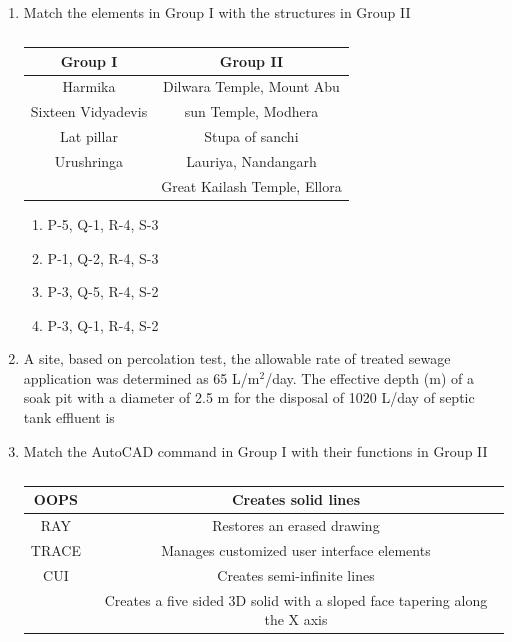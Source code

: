 \documentclass[journal,12pt,onecolumn]{IEEEtran}
\theoremstyle{remark}
\begin{document}
\begin{enumerate}
\hfill{}

\item Match the elements in Group I with the structures in Group II

\begin{table}[H]
\centering
\begin{tabular}{c|c}
Group I & Group II \\
\hline
Harmika & Dilwara Temple, Mount Abu \\
Sixteen Vidyadevis & sun Temple, Modhera \\
Lat pillar & Stupa of sanchi \\
Urushringa & Lauriya, Nandangarh \\
 & Great Kailash Temple, Ellora \\
\end{tabular}
\caption*{}
\label{tab:Q.35}
\end{table}

\hfill{}
\begin{enumerate}
\item P-5, Q-1, R-4, S-3
\item P-1, Q-2, R-4, S-3
\item P-3, Q-5, R-4, S-2
\item P-3, Q-1, R-4, S-2
\end{enumerate}

\item A site, based on percolation test, the allowable rate of treated sewage application was determined as 65 L/m$^2$/day. The effective depth (m) of a soak pit with a diameter of 2.5 m for the disposal of 1020 L/day of septic tank effluent is \underline{\hspace{2cm}}

\hfill{}

\item Match the AutoCAD command in Group I with their functions in Group II

\begin{table}[H]
\centering
\begin{tabular}{c|c}
OOPS & Creates solid lines \\
\hline
RAY & Restores an erased drawing \\
\hline
TRACE & Manages customized user interface elements \\
\hline
CUI & Creates semi-infinite lines \\
\hline
 & Creates a five sided 3D solid with a sloped face tapering along the X axis \\
\end{tabular}
\caption*{}
\label{tab:Q.37}
\end{table}


\end{enumerate}
\end{document}
